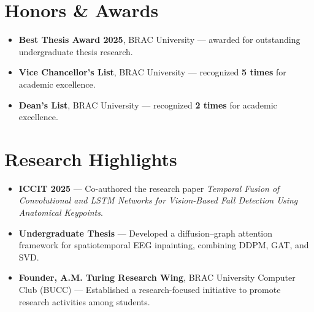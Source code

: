 \section{Honors \& Awards}

\begin{itemize}

    \item \textbf{Best Thesis Award 2025}, BRAC University — awarded for outstanding undergraduate thesis research.

    \item \textbf{Vice Chancellor's List}, BRAC University — recognized \textbf{5 times} for academic excellence.

    \item \textbf{Dean's List}, BRAC University — recognized \textbf{2 times} for academic excellence.

\end{itemize}

\section{Research Highlights}

\begin{itemize}

    \item \textbf{ICCIT 2025} — Co-authored the research paper \textit{Temporal Fusion of Convolutional and LSTM Networks for Vision-Based Fall Detection Using Anatomical Keypoints}.

    \item \textbf{Undergraduate Thesis} — Developed a diffusion--graph attention framework for spatiotemporal EEG inpainting, combining DDPM, GAT, and SVD.

    \item \textbf{Founder, A.M. Turing Research Wing}, BRAC University Computer Club (BUCC) — Established a research-focused initiative to promote research activities among students.

\end{itemize}

\endinput